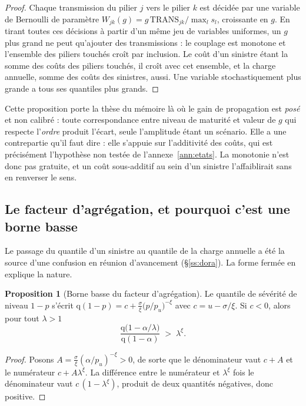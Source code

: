 \documentclass[12pt,a4paper]{article}
\theoremstyle{definition}
\newtheorem{proposition}{Proposition}
\begin{document}
\begin{proof}
Chaque transmission du pilier $j$ vers le pilier $k$ est décidée par une variable
de Bernoulli de paramètre $W_{jk}(g) = g\,\mathrm{TRANS}_{jk}/\max_l s_l$,
croissante en $g$. En tirant toutes ces décisions à partir d'un même jeu de
variables uniformes, un $g$ plus grand ne peut qu'ajouter des transmissions : le
couplage est monotone et l'ensemble des piliers touchés croît par inclusion. Le
coût d'un sinistre étant la somme des coûts des piliers touchés, il croît avec cet
ensemble, et la charge annuelle, somme des coûts des sinistres, aussi. Une variable
stochastiquement plus grande a tous ses quantiles plus grands.
\end{proof}

Cette proposition porte la thèse du mémoire là où le gain de propagation est
\emph{posé} et non calibré : toute correspondance entre niveau de maturité et
valeur de $g$ qui respecte l'\emph{ordre} produit l'écart, seule l'amplitude étant
un scénario. Elle a une contrepartie qu'il faut dire : elle s'appuie sur
l'additivité des coûts, qui est précisément l'hypothèse non testée de
l'annexe~\ref{ann:etats}. La monotonie n'est donc pas gratuite, et un coût
sous-additif au sein d'un sinistre l'affaiblirait sans en renverser le sens.

\subsection*{Le facteur d'agrégation, et pourquoi c'est une borne basse}

Le passage du quantile d'un sinistre au quantile de la charge annuelle a été la
source d'une confusion en réunion d'avancement (\S\ref{ss:dora}). La forme fermée
en explique la nature.

\begin{proposition}[Borne basse du facteur d'agrégation]
\label{prop:pont}
Le quantile de sévérité de niveau $1-p$ s'écrit
$\mathrm{q}(1-p) = c + \frac{\sigma}{\xi}\bigl(p/p_u\bigr)^{-\xi}$ avec
$c = u - \sigma/\xi$. Si $c < 0$, alors pour tout $\lambda > 1$
\[
  \frac{\mathrm{q}\bigl(1 - \alpha/\lambda\bigr)}{\mathrm{q}(1-\alpha)}
  \;>\; \lambda^{\xi}.
\]
\end{proposition}

\begin{proof}
Posons $A = \frac{\sigma}{\xi}(\alpha/p_u)^{-\xi} > 0$, de sorte que le
dénominateur vaut $c + A$ et le numérateur $c + A\lambda^{\xi}$. La différence
entre le numérateur et $\lambda^{\xi}$ fois le dénominateur vaut
$c\,(1 - \lambda^{\xi})$, produit de deux quantités négatives, donc positive.
\end{proof}
\end{document}
